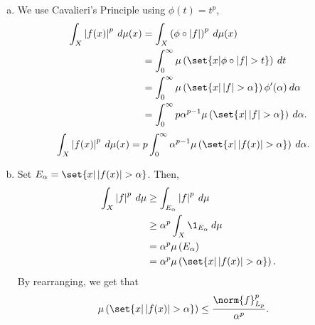\documentclass[10pt]{mypackage}
\begin{document}
\begin{enumerate}[(a)]
  \item We use Cavalieri's Principle using $\phi(t) = t^{p}$,
    \begin{align*}
      \int_{X}^{} \left\vert f(x) \right\vert^{p}\:d\mu(x) &= \int_{X}^{} \left( \phi\circ \left\vert f \right\vert \right)^{p}\:d\mu(x)\\
                                                           &= \int_{0}^{\infty} \mu\left( \set{x | \phi\circ \left\vert f \right\vert > t} \right)\:dt\\
                                                           &= \int_{0}^{\infty} \mu\left( \set{x | \left\vert f \right\vert > \alpha} \right) \phi'(\alpha)\:d\alpha\\
                                                           &= \int_{0}^{\infty} p\alpha^{p-1}\mu\left( \set{x | \left\vert f \right\vert > \alpha} \right) \:d\alpha.
    \end{align*}
    \begin{align*}
      \int_{X}^{} \left\vert f(x) \right\vert^{p}\:d\mu(x) &= p \int_{0}^{\infty} \alpha^{p-1}\mu\left( \set{x | \left\vert f(x) \right\vert > \alpha} \right)\:d\alpha.
    \end{align*}
  \item Set $E_{\alpha} = \set{x | \left\vert f(x) \right\vert > \alpha}$. Then,
    \begin{align*}
      \int_{X}^{} \left\vert f \right\vert^{p}\:d\mu &\geq \int_{E_{\alpha}}^{} \left\vert f \right\vert^{p}\:d\mu\\
                                                     &\geq \alpha^{p} \int_{X}^{} \1_{E_{\alpha}}\:d\mu\\
                                                     &= \alpha^{p} \mu\left( E_{\alpha} \right)\\
                                                     &= \alpha^{p} \mu\left( \set{x | \left\vert f(x) \right\vert > \alpha} \right).
    \end{align*}
    By rearranging, we get that
    \begin{align*}
      \mu\left( \set{x | \left\vert f(x) \right\vert > \alpha} \right) &\leq \frac{\norm{f}_{L_p}^{p}}{\alpha^{p}}.
    \end{align*}
\end{enumerate}
\end{document}
